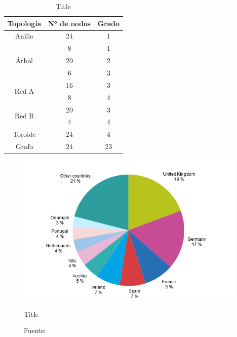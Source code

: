 \documentclass[conference]{IEEEtran}
\begin{document}
		\begin{table}[htbp]
			\caption{Title}
			\begin{center}
			\begin{tabular}{|c|c|c|}
				\hline
				\textbf{Topología}      & \textbf{N° de nodos} & \textbf{Grado} \\ \hline
				Anillo                               & 24                   & 1              \\ \hline
				\multirow{3}{*}{Árbol} & 8                    & 1              \\ \cline{2-3} 
														& 20                   & 2              \\ \cline{2-3} 
														& 6                    & 3              \\ \hline
				\multirow{2}{*}{Red A} & 16                   & 3              \\ \cline{2-3} 
														& 8                    & 4              \\ \hline
				\multirow{2}{*}{Red B} & 20                   & 3              \\ \cline{2-3} 
														& 4                    & 4              \\ \hline
				Toroide                        & 24                   & 4              \\ \hline
				Grafo                            & 24                   & 23             \\ \hline
				\end{tabular}
			\label{tab:tgrade}
			\end{center}
		\end{table}
        
		\begin{figure}[htb]
			\centering
			\includegraphics[scale=0.6]{img/fig1.png}
			\caption{Title}
			\caption*{Fuente: \cite{cuevas2013}}
			\label{fig:communication}
		\end{figure}
\end{document}
